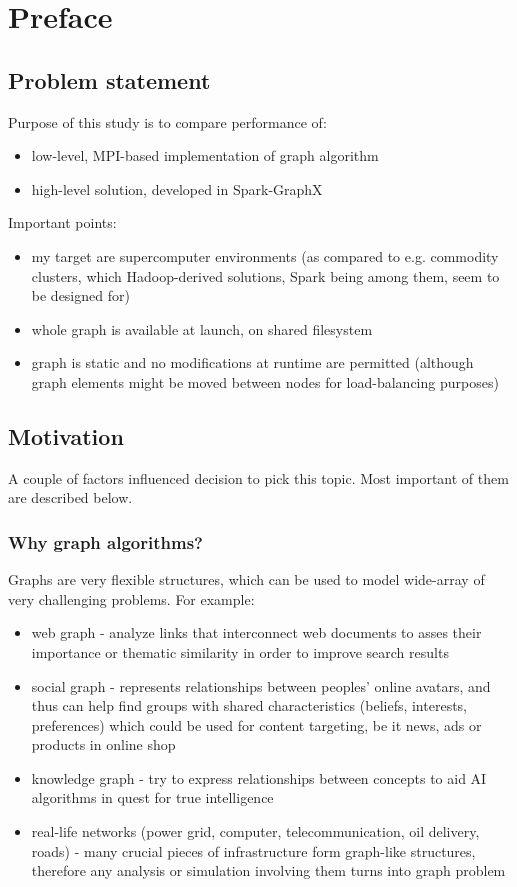 
\chapter{Preface}

\section{Problem statement}
Purpose of this study is to compare performance of:
\begin{itemize}
    \item low-level, MPI-based implementation of graph algorithm
    \item high-level solution, developed in Spark-GraphX
\end{itemize}
Important points:
\begin{itemize}
    \item my target are supercomputer environments (as compared to e.g. commodity clusters, which Hadoop-derived solutions, Spark being among them, seem to be designed for)
    \item whole graph is available at launch, on shared filesystem
    \item graph is static and no modifications at runtime are permitted (although graph elements might be moved between nodes for load-balancing purposes)
\end{itemize}

\section{Motivation}
A couple of factors influenced decision to pick this topic. Most important of them are described below.

\subsection{Why graph algorithms?}
Graphs are very flexible structures, which can be used to model wide-array of very challenging problems. For example:
\begin{itemize}
    \item web graph - analyze links that interconnect web documents to asses their importance or thematic similarity in order to improve search results
    \item social graph - represents relationships between peoples' online avatars, and thus can help find groups with shared characteristics (beliefs, interests, preferences) which could be used for content targeting, be it news, ads or products in online shop 
    \item knowledge graph - try to express relationships between concepts to aid AI algorithms in quest for true intelligence
    \item real-life networks (power grid, computer, telecommunication, oil delivery, roads) - many crucial pieces of infrastructure form graph-like structures, therefore any analysis or simulation involving them turns into graph problem
\end{itemize}

